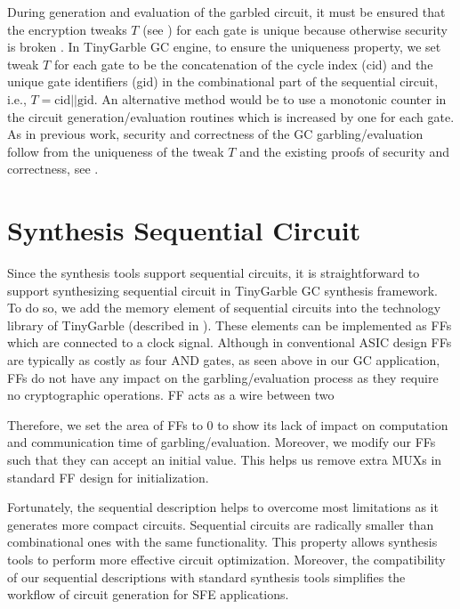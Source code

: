 During generation and evaluation of the garbled circuit, it must be ensured that the encryption tweaks $T$ (see ) for each gate is unique because otherwise security is broken \cite[Sect. 3.4]{henecka2013faster}.
In TinyGarble GC engine, to ensure the uniqueness property, we set tweak $T$ for each gate to be the concatenation of the cycle index (cid) and the unique gate identifiers (gid) in the combinational part of the sequential circuit, i.e., $T = \textrm{cid} || \textrm{gid}$.
An alternative method would be to use a monotonic counter in the circuit generation/evaluation routines which is increased by one for each gate.
As in previous work, security and correctness of the GC garbling/evaluation follow from the uniqueness of the tweak $T$ and the existing proofs of security and correctness, see \cite{lindell2009proof, bellare2013efficient}.

\section{Synthesis Sequential Circuit}
Since the synthesis tools support sequential circuits, it is straightforward to support synthesizing sequential circuit in TinyGarble GC synthesis framework.
To do so, we add the memory element of sequential circuits into the technology library of TinyGarble (described in ).
These elements can be implemented as FFs which are connected to a clock signal.
Although in conventional ASIC design FFs are typically as costly as four AND gates, as seen above in our GC application, FFs do not have any impact on the garbling/evaluation process as they require no cryptographic operations.
FF acts as a wire between two

Therefore, we set the area of FFs to 0 to show its lack of impact on computation and communication time of garbling/evaluation.
Moreover, we modify our FFs such that they can accept an initial value.
This helps us remove extra MUXs in standard FF design for initialization.


Fortunately, the sequential description helps to overcome most limitations as it generates more compact circuits.
Sequential circuits are radically smaller than combinational ones with the same functionality.
This property allows synthesis tools to perform more effective circuit optimization.
Moreover, the compatibility of our sequential descriptions with standard synthesis tools simplifies the workflow of circuit generation for SFE applications.

